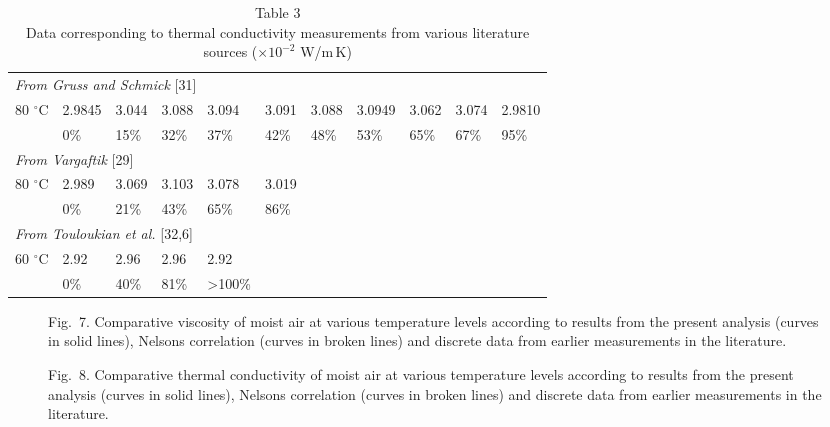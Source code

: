 \documentclass[11pt]{article}
\newcommand{\degC}{$^{\circ}$C}
\begin{document}
\begin{table}[htbp]
\centering
\footnotesize
\caption*{Table 3\\ Data corresponding to thermal conductivity
          measurements from various literature sources
          ($\times10^{-2}$ W/m\,K)}
\setlength{\tabcolsep}{4pt}
\begin{tabular}{lllllllllll}
\toprule
\multicolumn{11}{l}{\textit{From Gruss and Schmick} [31]} \\
80 \degC & 2.9845 & 3.044 & 3.088 & 3.094 & 3.091 & 3.088 & 3.0949 & 3.062 & 3.074 & 2.9810 \\
         & 0\%    & 15\%  & 32\%  & 37\%  & 42\%  & 48\%  & 53\%   & 65\%  & 67\%  & 95\% \\
\midrule
\multicolumn{11}{l}{\textit{From Vargaftik} [29]} \\
80 \degC & 2.989 & 3.069 & 3.103 & 3.078 & 3.019 & & & & & \\
         & 0\%   & 21\%  & 43\%  & 65\%  & 86\%  & & & & & \\
\midrule
\multicolumn{11}{l}{\textit{From Touloukian et al.} [32,6]} \\
60 \degC & 2.92 & 2.96 & 2.96 & 2.92    & & & & & & \\
         & 0\%  & 40\% & 81\% & >100\%  & & & & & & \\
\bottomrule
\end{tabular}
\end{table}

\begin{figure}[htbp]\centering
\caption*{Fig.~7. Comparative viscosity of moist air at various
temperature levels according to results from the present analysis
(curves in solid lines), Nelsons correlation (curves in broken lines)
and discrete data from earlier measurements in the literature.}
\end{figure}

\begin{figure}[htbp]\centering
\caption*{Fig.~8. Comparative thermal conductivity of moist air at
various temperature levels according to results from the present
analysis (curves in solid lines), Nelsons correlation (curves in
broken lines) and discrete data from earlier measurements in the
literature.}
\end{figure}
\end{document}
